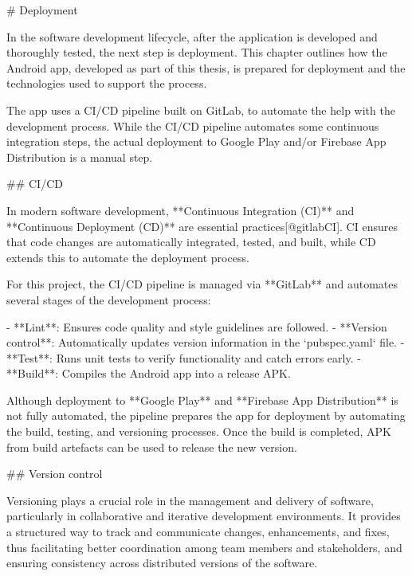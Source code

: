 \documentclass[
  digital,     %
  oneside,     %
  nosansbold,  %
  nocolorbold, %
  lof,         %
  lot,         %
]{fithesis4}
\begin{document}
\shorthandoff{-}
\begin{markdown}

# Deployment

In the software development lifecycle, after the application is developed and thoroughly tested, the next step is deployment. This chapter outlines how the Android app, developed as part of this thesis, is prepared for deployment and the technologies used to support the process.

The app uses a CI/CD pipeline built on GitLab, to automate the help with the development process.  While the CI/CD pipeline automates some continuous integration steps, the actual deployment to Google Play and/or Firebase App Distribution is a manual step.

## CI/CD

In modern software development, **Continuous Integration (CI)** and **Continuous Deployment (CD)** are essential practices[@gitlabCI]. CI ensures that code changes are automatically integrated, tested, and built, while CD extends this to automate the deployment process.

For this project, the CI/CD pipeline is managed via **GitLab** and automates several stages of the development process:

- **Lint**: Ensures code quality and style guidelines are followed.
- **Version control**: Automatically updates version information in the `pubspec.yaml` file.
- **Test**: Runs unit tests to verify functionality and catch errors early.
- **Build**: Compiles the Android app into a release APK.

Although deployment to **Google Play** and **Firebase App Distribution** is not fully automated, the pipeline prepares the app for deployment by automating the build, testing, and versioning processes. Once the build is completed, APK from build artefacts can be used to release the new version.

## Version control

Versioning plays a crucial role in the management and delivery of software, particularly in collaborative and iterative development environments. It provides a structured way to track and communicate changes, enhancements, and fixes, thus facilitating better coordination among team members and stakeholders, and ensuring consistency across distributed versions of the software.


\end{markdown}
\end{document}

